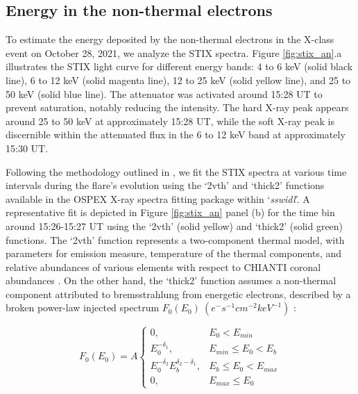 \subsection{Energy in the non-thermal electrons}\label{sec:non-therm}

To estimate the energy deposited by the non-thermal electrons in the X-class event on October 28, 2021, we analyze the STIX spectra. Figure \ref{fig:stix_an}.a illustrates the STIX light curve for different energy bands: 4 to 6 keV (solid black line), 6 to 12 keV (solid magenta line), 12 to 25 keV (solid yellow line), and 25 to 50 keV (solid blue line). The attenuator was activated around 15:28 UT to prevent saturation, notably reducing the intensity. The hard X-ray peak appears around 25 to 50 keV at approximately 15:28 UT, while the soft X-ray peak is discernible within the attenuated flux in the 6 to 12 keV band at approximately 15:30 UT.

Following the methodology outlined in \cite{emslie12}, we fit the STIX spectra at various time intervals during the flare's evolution using the `2vth' and `thick2' functions available in the OSPEX X-ray spectra fitting package within `{\it sswidl}'. A representative fit is depicted in Figure \ref{fig:stix_an} panel (b) for the time bin around 15:26-15:27 UT using the `2vth' (solid yellow) and `thick2' (solid green) functions. The `2vth' function represents a two-component thermal model, with parameters for emission measure, temperature of the thermal components, and relative abundances of various elements with respect to CHIANTI coronal abundances \citep{chianti1,chianti}. On the other hand, the `thick2' function assumes a non-thermal component attributed to bremsstrahlung from energetic electrons, described by a broken power-law injected spectrum $F_{0}(E_{0})~(e^{-}s^{-1}cm^{-2}keV^{-1})$ :

\begin{equation}
    F_{0}(E_{0})=A
    \begin{cases}
        0, & E_{0}<E_{min} \\
        E_{0}^{-\delta_{1}}, & E_{min} \le E_{0} < E_{b} \\
        E_{0}^{-\delta_{2}}E_{b}^{\delta_{2}-\delta_{1}}, & E_{b} \le E_{0} < E_{max} \\
        0, & E_{max} \le E_{0}
    \end{cases}
\end{equation}

